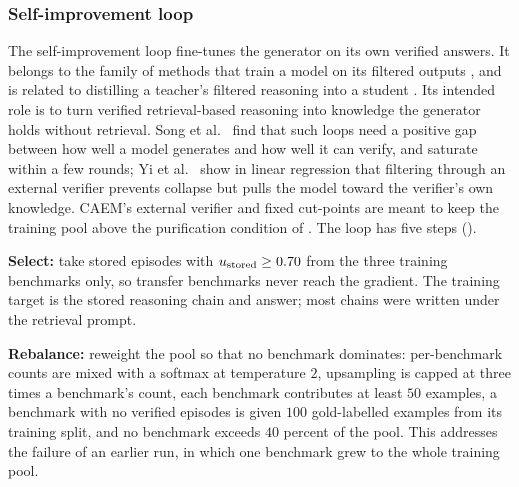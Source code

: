 \subsubsection{Self-improvement loop}
\label{sec:sil}

The self-improvement loop fine-tunes the generator on its own verified answers. It belongs to the family of methods that train a model on its filtered outputs \cite{NEURIPS2022_639a9a17,hosseini2024vstar,gulcehre2023rest}, and is related to distilling a teacher's filtered reasoning into a student \cite{ho2023large}. Its intended role is to turn verified retrieval-based reasoning into knowledge the generator holds without retrieval. Song et al.~\cite{song2024gap} find that such loops need a positive gap between how well a model generates and how well it can verify, and saturate within a few rounds; Yi et al.~\cite{fu2025collapse} show in linear regression that filtering through an external verifier prevents collapse but pulls the model toward the verifier's own knowledge. CAEM's external verifier and fixed cut-points are meant to keep the training pool above the purification condition of . The loop has five steps ().

\textbf{Select:} take stored episodes with $u_{\text{stored}} \ge 0.70$ from the three training benchmarks only, so transfer benchmarks never reach the gradient. The training target is the stored reasoning chain and answer; most chains were written under the retrieval prompt.

\textbf{Rebalance:} reweight the pool so that no benchmark dominates: per-benchmark counts are mixed with a softmax at temperature $2$, upsampling is capped at three times a benchmark's count, each benchmark contributes at least $50$ examples, a benchmark with no verified episodes is given $100$ gold-labelled examples from its training split, and no benchmark exceeds $40$ percent of the pool. This addresses the failure of an earlier run, in which one benchmark grew to the whole training pool.

